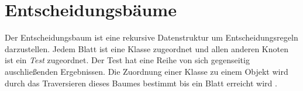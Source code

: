 \section{Entscheidungsbäume}
Der Entscheidungsbaum ist eine rekursive Datenstruktur um Entscheidungsregeln darzustellen. Jedem Blatt ist eine Klasse zugeordnet und allen anderen Knoten ist ein \textit{Test} zugeordnet. Der Test hat eine Reihe von sich
gegenseitig auschließenden Ergebnissen. Die Zuordnung einer Klasse zu einem Objekt wird durch das Traversieren dieses Baumes bestimmt bis ein Blatt erreicht wird \cite{quinlan1990decision}.

